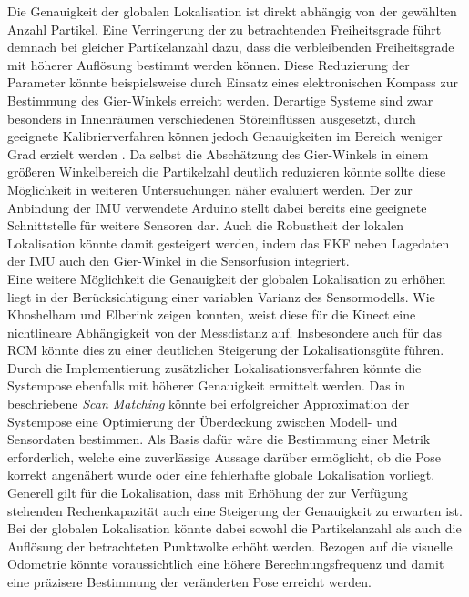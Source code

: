 Die Genauigkeit der globalen Lokalisation ist direkt abhängig von der gewählten Anzahl Partikel. Eine Verringerung der zu betrachtenden Freiheitsgrade führt demnach bei gleicher Partikelanzahl dazu, dass die verbleibenden Freiheitsgrade mit höherer Auflösung bestimmt werden können. Diese Reduzierung der Parameter könnte beispielsweise durch Einsatz eines elektronischen Kompass zur Bestimmung des Gier-Winkels erreicht werden. Derartige Systeme sind zwar besonders in Innenräumen verschiedenen Störeinflüssen ausgesetzt, durch geeignete Kalibrierverfahren können jedoch Genauigkeiten im Bereich weniger Grad erzielt werden \cite{Li2011}. Da selbst die Abschätzung des Gier-Winkels in einem größeren Winkelbereich die Partikelzahl deutlich reduzieren könnte sollte diese Möglichkeit in weiteren Untersuchungen näher evaluiert werden. Der zur Anbindung der IMU verwendete Arduino stellt dabei bereits eine geeignete Schnittstelle für weitere Sensoren dar. Auch die Robustheit der lokalen Lokalisation könnte damit gesteigert werden, indem das EKF neben Lagedaten der IMU auch den Gier-Winkel in die Sensorfusion integriert.\\

Eine weitere Möglichkeit die Genauigkeit der globalen Lokalisation zu erhöhen liegt in der Berücksichtigung einer variablen Varianz des Sensormodells. Wie Khoshelham und Elberink \cite{Khoshelham2012} zeigen konnten, weist diese für die Kinect eine nichtlineare Abhängigkeit von der Messdistanz auf. Insbesondere auch für das RCM könnte dies zu einer deutlichen Steigerung der Lokalisationsgüte führen.\\

Durch die Implementierung zusätzlicher Lokalisationsverfahren könnte die Systempose ebenfalls mit höherer Genauigkeit ermittelt werden. Das in  beschriebene \textit{Scan Matching} könnte bei erfolgreicher Approximation der Systempose eine Optimierung der Überdeckung zwischen Modell- und Sensordaten bestimmen. Als Basis dafür wäre die Bestimmung einer Metrik erforderlich, welche eine zuverlässige Aussage darüber ermöglicht, ob die Pose korrekt angenähert wurde oder eine fehlerhafte globale Lokalisation vorliegt.\\

Generell gilt für die Lokalisation, dass mit Erhöhung der zur Verfügung stehenden Rechenkapazität auch eine Steigerung der Genauigkeit zu erwarten ist. Bei der globalen Lokalisation könnte dabei sowohl die Partikelanzahl als auch die Auflösung der betrachteten Punktwolke erhöht werden. Bezogen auf die visuelle Odometrie könnte voraussichtlich eine höhere Berechnungsfrequenz und damit eine präzisere Bestimmung der veränderten Pose erreicht werden.\\

